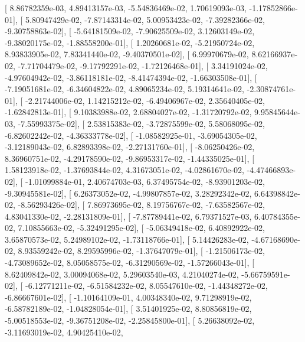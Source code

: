 \documentclass{article}
\begin{document}
       [  8.86782359e-03,   4.89413157e-03,  -5.54836469e-02,
          1.70619093e-03,  -1.17852866e-01],
       [  5.80947429e-02,  -7.87143314e-02,   5.00953423e-02,
         -7.39282366e-02,  -9.30758863e-02],
       [ -5.64181509e-02,  -7.90625509e-02,   3.12603149e-02,
         -9.38020175e-02,  -1.88558200e-01],
       [  1.20260681e-02,  -5.21950724e-02,   8.93833905e-02,
          7.83341440e-02,  -9.40370501e-02],
       [  6.99970679e-02,   8.62166937e-02,  -7.71704479e-02,
         -9.17792291e-02,  -1.72126468e-01],
       [  3.34191024e-02,  -4.97604942e-02,  -3.86118181e-02,
         -8.41474394e-02,  -1.66303508e-01],
       [ -7.19051681e-02,  -6.34604822e-02,   4.89065234e-02,
          5.19314641e-02,  -2.30874761e-01],
       [ -2.21744006e-02,   1.14215212e-02,  -6.49406967e-02,
          2.35640405e-02,  -1.62842813e-01],
       [  9.10383988e-02,   2.68804027e-02,  -1.31720792e-02,
          9.95845644e-03,  -7.55993375e-02],
       [  2.53815383e-02,  -3.72875599e-02,   5.58068095e-02,
         -6.82602242e-02,  -4.36333778e-02],
       [ -1.08582925e-01,  -3.69054305e-02,  -3.12189043e-02,
          6.82893398e-02,  -2.27131760e-01],
       [ -8.06250426e-02,   8.36960751e-02,  -4.29178590e-02,
         -9.86953317e-02,  -1.44335025e-01],
       [  1.58123918e-02,  -1.37693844e-02,   4.31673051e-02,
         -4.02861670e-02,  -4.47466893e-02],
       [ -1.01099884e-01,   2.40674703e-03,   6.37495754e-02,
         -8.93901203e-02,  -9.30945581e-02],
       [  6.26373052e-02,  -4.99807857e-02,   3.28292342e-02,
          6.64398842e-02,  -8.56293426e-02],
       [  7.86973695e-02,   8.19756767e-02,  -7.63582567e-02,
          4.83041330e-02,  -2.28131809e-01],
       [ -7.87789441e-02,   6.79371527e-03,   6.40784355e-02,
          7.10855663e-02,  -5.32491295e-02],
       [ -5.06349418e-02,   6.40892922e-02,   3.65870573e-02,
          5.24989102e-02,  -1.73118766e-01],
       [  5.14426283e-02,  -4.67168690e-02,   8.93559242e-02,
          8.29595996e-02,  -1.37647079e-01],
       [ -1.21506173e-02,  -4.73089652e-02,   8.05058575e-02,
         -6.31290569e-02,  -1.57266043e-01],
       [  8.62409842e-02,   3.00094068e-02,   5.29603540e-03,
          4.21040274e-02,  -5.66759591e-02],
       [ -6.12771211e-02,  -6.51584232e-02,   8.05547610e-02,
         -1.44348272e-02,  -6.86667601e-02],
       [ -1.10164109e-01,   4.00348340e-02,   9.71298919e-02,
         -6.58782189e-02,  -1.04828054e-01],
       [  3.51401925e-02,   8.80856819e-02,  -5.00518553e-02,
         -9.36751208e-02,  -2.25845800e-01],
       [  5.26638092e-02,  -3.11693019e-02,   4.90425410e-02,
\end{document}
